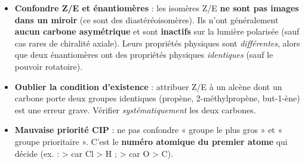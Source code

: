 \documentclass[11pt]{article}
\begin{document}
\begin{attention}
\begin{itemize}
\item \textbf{Confondre Z/E et énantiomères} : les isomères Z/E \textbf{ne sont pas images dans un miroir} (ce sont des diastéréoisomères). Ils n'ont généralement \textbf{aucun carbone asymétrique} et sont \textbf{inactifs} sur la lumière polarisée (sauf cas rares de chiralité axiale). Leurs propriétés physiques sont \emph{différentes}, alors que deux énantiomères ont des propriétés physiques \emph{identiques} (sauf le pouvoir rotatoire).
\item \textbf{Oublier la condition d'existence} : attribuer Z/E à un alcène dont un carbone porte deux groupes identiques (propène, 2-méthylpropène, but-1-ène) est une erreur grave. Vérifier \emph{systématiquement} les deux carbones.
\item \textbf{Mauvaise priorité CIP} : ne pas confondre « groupe le plus gros » et « groupe prioritaire ». C'est le \textbf{numéro atomique du premier atome} qui décide (ex. :  >  car Cl > H ;  >  car O > C).
\end{itemize}
\end{attention}
\end{document}
